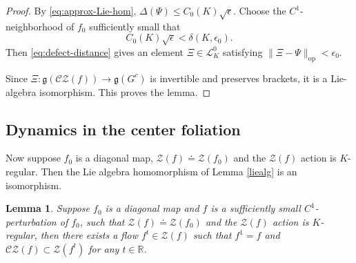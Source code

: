 \documentclass[11pt]{amsart}
\numberwithin{equation}{section}
\newcommand{\R}{\mathbb{R}}
\newcommand{\CZ}{\mathcal{CZ}}
\theoremstyle{plain}
\newtheorem{lem}[thm]{Lemma}
\begin{document}
\begin{proof}
By \eqref{eq:approx-Lie-hom},
$
\Delta(\Psi)\le C_0(K)\sqrt{\epsilon}.
$
Choose the $C^1$-neighborhood of $f_0$ sufficiently small that
\[
C_0(K)\sqrt{\epsilon}<\delta(K,\epsilon_0).
\]
Then \eqref{eq:defect-distance} gives an element
$\Xi\in\mathcal L_K^0$ satisfying $
\|\Xi-\Psi\|_{\mathrm{op}}<\epsilon_0.$ 

Since $\Xi: \mathfrak g(\CZ(f))\longrightarrow\mathfrak g(G^c)$ is invertible and preserves brackets, it is a Lie-algebra
isomorphism.
This proves the lemma.


\end{proof}
\subsection{Dynamics in the center foliation}\label{sec:gcendyn}
Now suppose $f_0$ is a diagonal map,
$\mathcal Z(f)\doteq \mathcal Z(f_0)$ and the $\mathcal Z(f)$ action is $K$-regular. Then the Lie algebra homomorphism
of Lemma \ref{liealg} is an isomorphism.

\begin{lem}\label{lem:finflow}
    Suppose $f_0$ is a diagonal map and $f$ is a sufficiently small $C^1$-perturbation of $f_0$, such that
$\mathcal Z(f)\doteq \mathcal Z(f_0)$ and the $\mathcal Z(f)$ action is $K$-regular, then there exists a flow $f^t\in \mathcal Z(f)$ such that $f^1=f$ and $\mathcal {CZ}(f)\subset \mathcal Z(f^t)$ for any $t\in \R$.
\end{lem}
\end{document}
